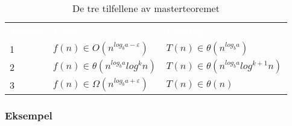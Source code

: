 \begin{table}[H]
    \caption{De tre tilfellene av masterteoremet}
    \label{tab:masterteoremet}
    \centering
    \begin{tabular}{|L{5em} | L{18em}|L{18em}|}
        \hline
        \textbf{\textcolor{white}{Tilfelle}} & \textbf{\textcolor{white}{Krav}} & \textbf{\textcolor{white}{Løsning}}\\
        1 & $f(n) \in O(n^{log_b a-\varepsilon})$ & $T(n) \in \theta(n^{log_b a})$ \\
        2 & $f(n) \in \theta(n^{log_b a} log^k n)$ & $T(n) \in \theta(n^{log_b a} log^{k + 1}n)$ \\
        3 & $f(n) \in \Omega(n^{log_b a+\varepsilon})$ & $T(n) \in \theta(n)$ \\
         \hline
    \end{tabular}
\end{table}

\subsubsection{Eksempel}